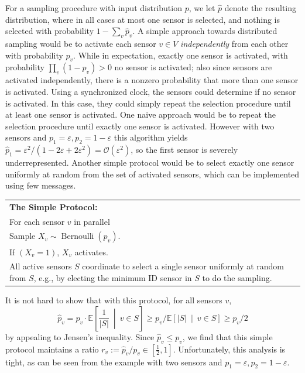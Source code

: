 \documentclass{sig-alternate-dan}
\numberwithin{equation}{section}
\newcommand{\cO}{\mathcal{O}}
\newcommand{\sensor}{\ensuremath{v}}
\newcommand{\sensors}{V}
\newcommand{\psamp}{\ensuremath{\hat{p}}}
\newcommand{\Bernoulli}[1]{\ensuremath{\operatorname{Bernoulli}({#1})}}
\newcommand{\eps}{\varepsilon}
\newcommand{\Econd}[2]{\ensuremath{\mathbb{E}\left[  {#1} \ \middle| \ {#2}\right] }}  %
\begin{document}
%
%
For a sampling procedure with input distribution $p$, we let $\psamp$
denote the resulting distribution, where in all cases at most one
sensor is selected, and nothing is selected with probability
$1-\sum_{\sensor} \psamp_{\sensor}$.  A simple approach towards
distributed sampling would be to activate each sensor
$\sensor\in\sensors$ \emph{independently} from each other with
probability $p_{\sensor}$. While in expectation, exactly one sensor is
activated, with probability $\prod_{\sensor} (1-p_{\sensor})>0$ no
sensor is activated; also since sensors are activated independently,
there is a nonzero probability that more than one sensor is activated.
Using a synchronized clock, the sensors could determine if no sensor
is activated.  In this case, they could simply repeat the selection
procedure until at least one sensor is activated.  
One naive approach would be to repeat the selection
procedure until exactly one sensor is activated.  
However with two sensors and $p_1 = \eps, p_2 = 1 - \eps$ this
algorithm yields $\psamp_1 = \eps^2 / (1 - 2\eps + 2 \eps^2) =
\cO(\eps^2)$, so the first sensor is severely underrepresented.
Another simple protocol would be to select exactly one sensor uniformly at
random from the set of activated sensors, which can be implemented using few messages.
%
%
%

%
%

\begin{center}
\begin{tabular}{|p{7.6cm}|}
\hline
\textbf{The Simple Protocol:}\\
\hspace{0cm} For each sensor $\sensor$ in parallel\\
\hspace{0.5cm} Sample $X_{\sensor} \sim \Bernoulli{p_{\sensor}}$.\\
\hspace{0.5cm} If $(X_{\sensor} = 1)$, $X_{\sensor}$ activates.\\ 
%
\hspace{0cm} All active sensors $S$ coordinate to select a single
sensor uniformly at random from $S$, e.g., by electing the minimum ID
sensor in $S$ to do the sampling.\\
%
%
%
%
%
\hline
\end{tabular}
\end{center}

\noindent
It is not hard to show that with this protocol, for all sensors $\sensor$, 
\[
\psamp_{\sensor} = p_{\sensor}\cdot \Econd{\frac{1}{|S|}}{\sensor \in S} \ge p_{\sensor}/ \Econd{|S|}{\sensor \in S} \ge
p_{\sensor}/2 
\] 
by appealing to Jensen's inequality.  Since $\psamp_{\sensor} \le
p_{\sensor}$, we find that this simple protocol maintains a ratio
$r_{\sensor} := \psamp_{\sensor} / p_{\sensor} \in [\frac12 , 1]$.
Unfortunately, this analysis is tight, as can be seen from the example
with two sensors and $p_1 = \eps, p_2 = 1 - \eps$.
\end{document}
